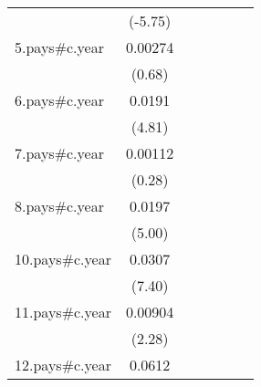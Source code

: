 {\begin{tabular}{l*{6}{c}}
                    &     (-5.75)         &                     &                     &                     &                     &                     \\
[1em]
5.pays#c.year       &     0.00274         &                     &                     &                     &                     &                     \\
                    &      (0.68)         &                     &                     &                     &                     &                     \\
[1em]
6.pays#c.year       &      0.0191\sym{***}&                     &                     &                     &                     &                     \\
                    &      (4.81)         &                     &                     &                     &                     &                     \\
[1em]
7.pays#c.year       &     0.00112         &                     &                     &                     &                     &                     \\
                    &      (0.28)         &                     &                     &                     &                     &                     \\
[1em]
8.pays#c.year       &      0.0197\sym{***}&                     &                     &                     &                     &                     \\
                    &      (5.00)         &                     &                     &                     &                     &                     \\
[1em]
10.pays#c.year      &      0.0307\sym{***}&                     &                     &                     &                     &                     \\
                    &      (7.40)         &                     &                     &                     &                     &                     \\
[1em]
11.pays#c.year      &     0.00904\sym{*}  &                     &                     &                     &                     &                     \\
                    &      (2.28)         &                     &                     &                     &                     &                     \\
[1em]
12.pays#c.year      &      0.0612\sym{***}&                     &                     &                     &                     &                     \\

\end{tabular}}
